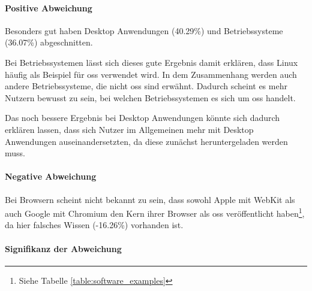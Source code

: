 \documentclass[a4paper]{article}
\begin{document}
                \paragraph{Positive Abweichung}
                    Besonders gut haben Desktop Anwendungen ({\scriptsize 40.29\%}) und Betriebssysteme ({\scriptsize 36.07\%}) abgeschnitten.
                    
                    Bei Betriebssystemen lässt sich dieses gute Ergebnis damit erklären, dass Linux häufig als Beispiel für \gls{oss} verwendet wird. In dem Zusammenhang werden auch andere Betriebssysteme, die nicht \gls{oss} sind erwähnt. Dadurch scheint es mehr Nutzern bewusst zu sein, bei welchen Betriebssystemen es sich um \gls{oss} handelt.
                    
                    Das noch bessere Ergebnis bei Desktop Anwendungen könnte sich dadurch erklären lassen, dass sich Nutzer im Allgemeinen mehr mit Desktop Anwendungen auseinandersetzten, da diese zunächst heruntergeladen werden muss.
                
                \paragraph{Negative Abweichung}
                    Bei Browsern scheint nicht bekannt zu sein, dass sowohl Apple mit WebKit als auch Google mit Chromium den Kern ihrer Browser als \gls{oss} veröffentlicht haben\footnote{Siehe Tabelle \ref{table:software_examples}}, da hier falsches Wissen ({\scriptsize -16.26\%}) vorhanden ist. 
                    
                \paragraph{Signifikanz der Abweichung}
                
\end{document}
